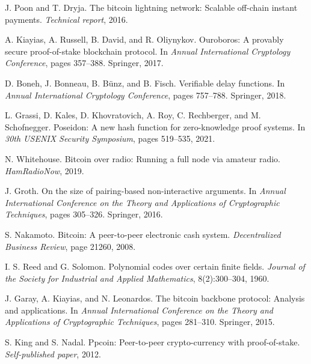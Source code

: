 \documentclass[11pt,a4paper]{article}
\begin{document}
\begin{thebibliography}{99}

J. Poon and T. Dryja.
\newblock The bitcoin lightning network: Scalable off-chain instant payments.
\newblock \emph{Technical report}, 2016.

A. Kiayias, A. Russell, B. David, and R. Oliynykov.
\newblock Ouroboros: A provably secure proof-of-stake blockchain protocol.
\newblock In \emph{Annual International Cryptology Conference}, pages 357--388. Springer, 2017.

D. Boneh, J. Bonneau, B. Bünz, and B. Fisch.
\newblock Verifiable delay functions.
\newblock In \emph{Annual International Cryptology Conference}, pages 757--788. Springer, 2018.

L. Grassi, D. Kales, D. Khovratovich, A. Roy, C. Rechberger, and M. Schofnegger.
\newblock Poseidon: A new hash function for zero-knowledge proof systems.
\newblock In \emph{30th USENIX Security Symposium}, pages 519--535, 2021.

N. Whitehouse.
\newblock Bitcoin over radio: Running a full node via amateur radio.
\newblock \emph{HamRadioNow}, 2019.

J. Groth.
\newblock On the size of pairing-based non-interactive arguments.
\newblock In \emph{Annual International Conference on the Theory and Applications of Cryptographic Techniques}, pages 305--326. Springer, 2016.

S. Nakamoto.
\newblock Bitcoin: A peer-to-peer electronic cash system.
\newblock \emph{Decentralized Business Review}, page 21260, 2008.

I. S. Reed and G. Solomon.
\newblock Polynomial codes over certain finite fields.
\newblock \emph{Journal of the Society for Industrial and Applied Mathematics}, 8(2):300--304, 1960.

J. Garay, A. Kiayias, and N. Leonardos.
\newblock The bitcoin backbone protocol: Analysis and applications.
\newblock In \emph{Annual International Conference on the Theory and Applications of Cryptographic Techniques}, pages 281--310. Springer, 2015.

S. King and S. Nadal.
\newblock Ppcoin: Peer-to-peer crypto-currency with proof-of-stake.
\newblock \emph{Self-published paper}, 2012.

\end{thebibliography}
\end{document}
